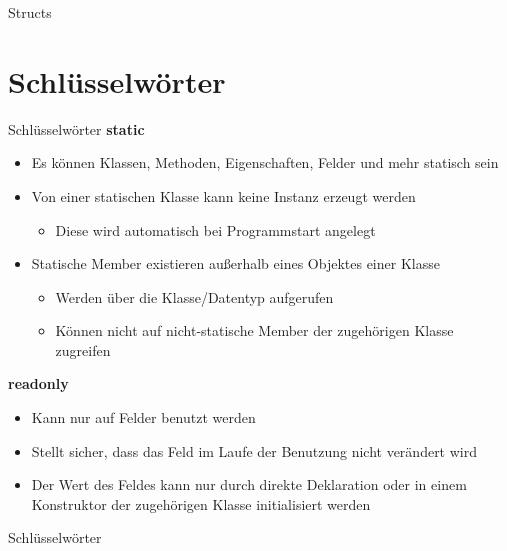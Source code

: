 \begin{frame}{Structs}
	
	
\end{frame}

\section{Schlüsselwörter}
\begin{frame}{Schlüsselwörter}
	\textbf{static}\\
	\begin{itemize}
		\item Es können Klassen, Methoden, Eigenschaften, Felder und mehr statisch sein
		\item Von einer statischen Klasse kann keine Instanz erzeugt werden
		\begin{itemize}
			\item Diese wird automatisch bei Programmstart angelegt
		\end{itemize}
		\item Statische Member existieren außerhalb eines Objektes einer Klasse
		\begin{itemize}
			\item Werden über die Klasse/Datentyp aufgerufen
			\item Können nicht auf nicht-statische Member der zugehörigen Klasse zugreifen
		\end{itemize}
	\end{itemize}
	\textbf{readonly}\\
	\begin{itemize}
		\item Kann nur auf Felder benutzt werden
		\item Stellt sicher, dass das Feld im Laufe der Benutzung nicht verändert wird
		\item Der Wert des Feldes kann nur durch direkte Deklaration oder in einem Konstruktor der zugehörigen Klasse initialisiert werden
	\end{itemize}
\end{frame}

\begin{frame}{Schlüsselwörter}
	
\end{frame}

